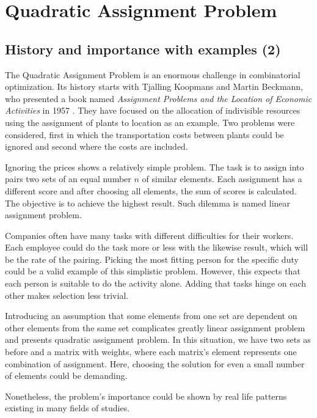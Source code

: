 \section{Quadratic Assignment Problem}
\label{section:background_qap}

\subsection{History and importance with examples (2)}

The Quadratic Assignment Problem is an enormous challenge in combinatorial optimization.
Its history starts with Tjalling Koopmans and Martin Beckmann, who presented a book named \textit{Assignment Problems and the Location of Economic Activities} in 1957 \cite{koopmans-beckmann1957}.
They have focused on the allocation of indivisible resources using the assignment of plants to location as an example.
Two problems were considered, first in which the transportation costs between plants could be ignored and second where the costs are included.

Ignoring the prices shows a relatively simple problem.
The task is to assign into pairs two sets of an equal number $n$ of similar elements.
Each assignment has a different score and after choosing all elements, the sum of scores is calculated.
The objective is to achieve the highest result.
Such dilemma is named linear assignment problem.

Companies often have many tasks with different difficulties for their workers.
Each employee could do the task more or less with the likewise result, which will be the rate of the pairing.
Picking the most fitting person for the specific duty could be a valid example of this simplistic problem.
However, this expects that each person is suitable to do the activity alone.
Adding that tasks hinge on each other makes selection less trivial.

Introducing an assumption that some elements from one set are dependent on other elements from the same set complicates greatly linear assignment problem and presents quadratic assignment problem.
In this situation, we have two sets as before and a matrix with weights, where each matrix's element represents one combination of assignment.
Here, choosing the solution for even a small number of elements could be demanding.

Nonetheless, the problem's importance could be shown by real life patterns existing in many fields of studies.

